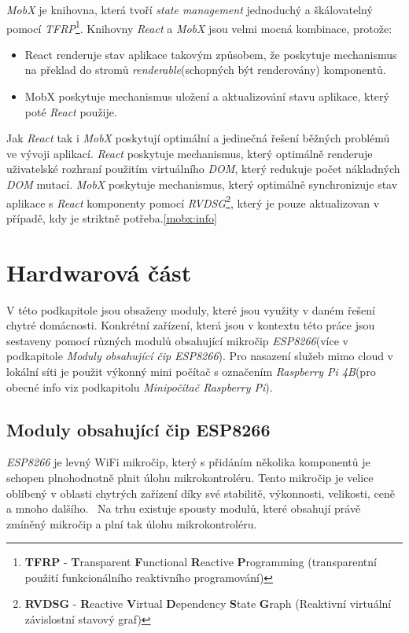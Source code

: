 \emph{MobX} je knihovna, která tvoří \emph{state management} jednoduchý a škálovatelný pomocí \emph{TFRP}\footnote{\textbf{TFRP} - \textbf{T}ransparent \textbf{F}unctional \textbf{R}eactive \textbf{P}rogramming (transparentní použití funkcionálního reaktivního programování)}.
Knihovny \emph{React} a \emph{MobX} jsou velmi mocná kombinace, protože:
\begin{itemize}
  \item React renderuje stav aplikace takovým způsobem, že poskytuje mechanismus na překlad do stromů \emph{renderable}(schopných být renderovány) komponentů.
  \item MobX poskytuje mechanismus uložení a aktualizování stavu aplikace, který poté \emph{React} použije.
\end{itemize}

Jak \emph{React} tak i \emph{MobX} poskytují optimální a jedinečná řešení běžných problémů ve vývoji aplikací.
\emph{React} poskytuje mechanismus, který optimálně renderuje uživatelské rozhraní použitím virtuálního \emph{DOM}, který redukuje počet nákladných \emph{DOM} mutací.
\emph{MobX} poskytuje mechanismus, který optimálně synchronizuje stav aplikace s \emph{React} komponenty pomocí
\emph{RVDSG}\footnote{\textbf{RVDSG} - \textbf{R}eactive \textbf{V}irtual \textbf{D}ependency \textbf{S}tate \textbf{G}raph (Reaktivní virtuální závislostní stavový graf)}, který je pouze aktualizovan v případě, kdy je striktně potřeba.\ref{mobx:info}

\newpage
\section{Hardwarová část}
\label{pouzite:hw}
V této podkapitole jsou obsaženy moduly, které jsou využity v daném řešení chytré domácnosti.
Konkrétní zařízení, která jsou v kontextu této práce jsou sestaveny pomocí různých modulů obsahující mikročip \emph{ESP8266}(více v podkapitole \emph{Moduly obsahující čip ESP8266}).
Pro nasazení služeb mimo cloud v lokální síti je použit výkonný mini počítač s označením \emph{Raspberry Pi 4B}(pro obecné info viz podkapitolu \emph{Minipočítač Raspberry Pi}).

\subsection*{Moduly obsahující čip ESP8266}
\label{terminy:esp8266}

\emph{ESP8266} je levný WiFi mikročip, který s přidáním několika komponentů je schopen plnohodnotně plnit úlohu mikrokontroléru.
Tento mikročip je velice oblíbený v oblasti chytrých zařízení díky své stabilitě, výkonnosti, velikosti, ceně a mnoho dalšího.~\cite{wiki:esp}
Na trhu existuje spousty modulů, které obsahují právě zmíněný mikročip a plní tak úlohu mikrokontroléru.

